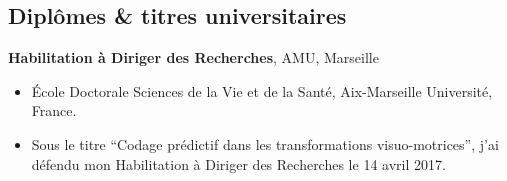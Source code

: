 \documentclass[10pt,french,a4paper]{article}%
\newcommand{\years}[1]{\marginpar{\textit{\scriptsize #1}}}
\begin{document}
\newpage 
\subsection{Diplômes \& titres universitaires}

\textbf{Habilitation à Diriger des Recherches}, AMU, Marseille\hfill \years{\textbf{2017}}\\
\vspace*{-.15in}
\begin{itemize}
\item[] \'Ecole Doctorale Sciences de la Vie et de la Santé, Aix-Marseille Université, France.
\item[] Sous le titre ``Codage prédictif dans les transformations visuo-motrices'', j'ai défendu mon Habilitation à Diriger des Recherches le 14 avril 2017.
\end{itemize} %
\end{document}
